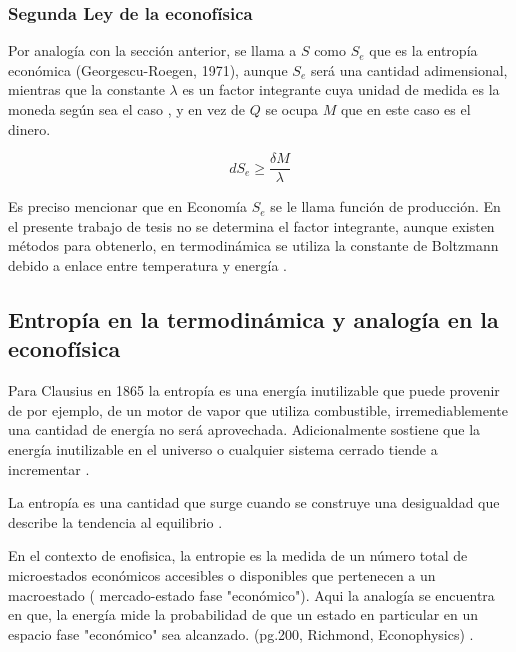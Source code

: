 \subsubsection{Segunda Ley de la econofísica} 

Por analogía con la sección anterior, se llama a $S$ como $S_e$ que es la entropía económica (Georgescu-Roegen, 1971), aunque $S_e$ será una cantidad adimensional, mientras que la constante $\lambda$ es un factor integrante cuya unidad de medida es la moneda según sea el caso \citep[][pagina 166]{richmond} , y en vez de $Q$ se ocupa $M$ que en este caso es el dinero. 

\begin{equation}
dS_e \geqslant \frac{\delta M}{\lambda}
\end{equation}

Es preciso mencionar que en Economía $S_e$ se le llama función de producción. En el presente trabajo de tesis no se determina el factor integrante, aunque existen métodos para obtenerlo, en termodinámica se utiliza la constante de Boltzmann debido a enlace entre temperatura y energía \citep[][pagina 166]{richmond}. 

\subsection{Entropía en la termodinámica y analogía en la econof\'isica} 

Para Clausius en 1865 la entropía es una energía inutilizable que puede provenir de por ejemplo, de un motor de vapor que utiliza combustible, irremediablemente una cantidad de energía no será aprovechada. Adicionalmente sostiene que la energía inutilizable en el universo o cualquier sistema cerrado tiende a incrementar \citep[][pagina 21]{cottrell_classical_2009}. 

La entropía es una cantidad que surge cuando se construye una desigualdad que describe la tendencia al equilibrio  \citep[][pagina 70]{keszei2011chemical}. 


En el contexto de enofisica, la entropie es la medida de un número total de microestados económicos accesibles o disponibles que pertenecen a un macroestado ( mercado-estado fase "económico"). Aqui la analogía se encuentra en que, la energía mide la probabilidad de que un estado en particular en un espacio fase "económico" sea alcanzado. (pg.200, Richmond, Econophysics) \citep{cottrell_classical_2009}.

